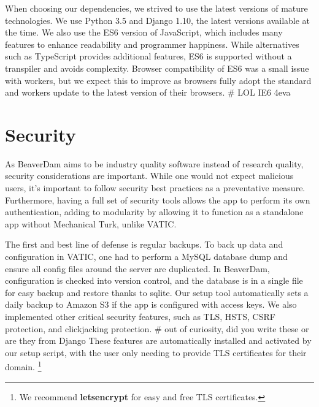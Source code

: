 When choosing our dependencies, we strived to use the latest versions of mature technologies.
We use Python 3.5 and Django 1.10, the latest versions available at the time.
We also use the ES6 version of JavaScript, which includes many features to enhance readability and programmer happiness.
While alternatives such as TypeScript provides additional features, ES6 is supported without a transpiler and avoids complexity.
Browser compatibility of ES6 was a small issue with workers, but we expect this to improve as browsers fully adopt the standard and workers update to the latest version of their browsers. # LOL IE6 4eva

\section{Security}

As BeaverDam aims to be industry quality software instead of research quality, security considerations are important.
While one would not expect malicious users, it's important to follow security best practices as a preventative measure.
Furthermore, having a full set of security tools allows the app to perform its own authentication,
adding to modularity by allowing it to function as a standalone app without Mechanical Turk, unlike VATIC.

The first and best line of defense is regular backups.
To back up data and configuration in VATIC, one had to perform a MySQL database dump and ensure all config files around the server are duplicated.
In BeaverDam, configuration is checked into version control, and the database is in a single file for easy backup and restore thanks to sqlite.
Our setup tool automatically sets a daily backup to Amazon S3 if the app is configured with access keys.
We also implemented other critical security features, such as TLS, HSTS, CSRF protection, and clickjacking protection. # out of curiosity, did you write these or are they from Django
These features are automatically installed and activated by our setup script,
with the user only needing to provide TLS certificates for their domain. \footnote{We recommend \textbf{letsencrypt} for easy and free TLS certificates.}


